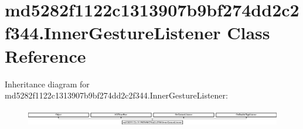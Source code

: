 \hypertarget{classmd5282f1122c1313907b9bf274dd2c2f344_1_1InnerGestureListener}{}\section{md5282f1122c1313907b9bf274dd2c2f344.\+Inner\+Gesture\+Listener Class Reference}
\label{classmd5282f1122c1313907b9bf274dd2c2f344_1_1InnerGestureListener}
Inheritance diagram for md5282f1122c1313907b9bf274dd2c2f344.\+Inner\+Gesture\+Listener\+:\begin{figure}[H]
\begin{center}
\leavevmode
\includegraphics[height=0.736842cm]{classmd5282f1122c1313907b9bf274dd2c2f344_1_1InnerGestureListener}
\end{center}
\end{figure}
